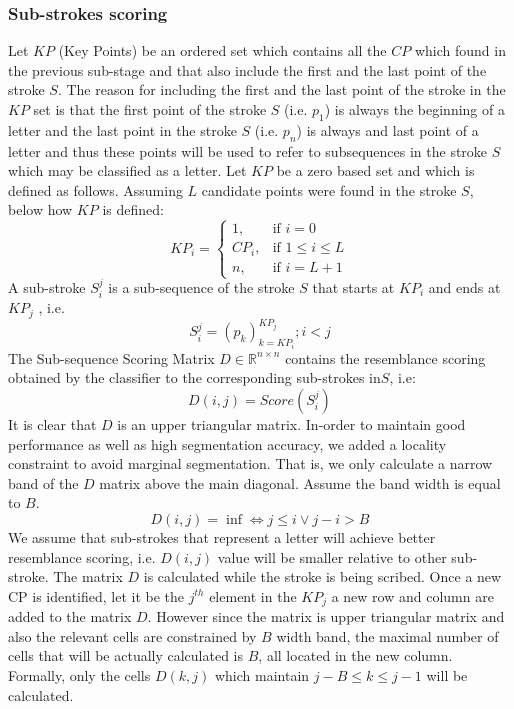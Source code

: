 \documentclass[journal,compsoc]{IEEEtran}
\begin{document}
\subsubsection{Sub-strokes scoring}
Let $KP$ (Key Points) be an ordered set which contains all the $CP$ which found in the previous sub-stage and that also include the first and the last point of the stroke $S$. The reason for including the first and the last point of the stroke in the $KP$ set is that the first point of the stroke $S$ (i.e. $p_{1}$) is always the beginning of a letter and the last point in the stroke $S$ (i.e. $p_{n}$) is always and last point of a letter and thus these points will be used to refer to subsequences in the stroke $S$ which may be classified as a letter. Let $KP$ be a zero based set and which is defined as follows. Assuming $L$ candidate points were found in the stroke $S$, below how $KP$ is defined: 
\begin{equation}
KP_{i} =\begin{cases}    1		, & \mbox{if } i=0 \\
							   CP_{i}	, & \mbox{if } 1\leq i \leq L \\
							   n    , & \mbox{if } i=L+1 
			\end{cases}				
\end{equation}
A sub-stroke $S_{i}^{j}$ is a sub-sequence of the stroke $S$ that starts at $KP_{i}$ and ends at $KP_{j}$ , i.e.
\begin{equation}
S_{i}^{j}=(p_{k})_{k=KP_{i}}^{KP_{j}}; i<j
\end{equation}
The Sub-sequence Scoring Matrix $D\in\mathbb{R}^{n\times n}$ contains the resemblance scoring obtained by the classifier to the corresponding sub-strokes in$S$, i.e:
\begin{equation}
D(i,j)=Score(S_{i}^{j})
\end{equation}
It is clear that $D$ is an upper triangular matrix. In-order to maintain good performance as well as high segmentation accuracy, we added a locality constraint to avoid marginal segmentation. That is, we only calculate a narrow band of the $D$ matrix above the main diagonal. Assume the band width is equal to $B$.
\begin{equation}
D(i,j)=\inf \Leftrightarrow j \leq i \vee j-i>B 
\end{equation}
We assume that sub-strokes that represent a letter will achieve better resemblance scoring, i.e. $D(i,j)$ value will be smaller relative to other sub-stroke. The matrix $D$ is calculated while the stroke is being scribed. Once a new CP is identified, let it be the $j^{th}$ element in the $KP_{j}$ a new row and column are added to the matrix $D$. However since the matrix is upper triangular matrix and also the relevant cells are constrained by $B$ width band, the maximal number of cells that will be actually calculated is $B$, all located in the new column. Formally, only the cells $D(k,j)$ which maintain $j-B\leq k \leq j-1$ will be calculated.\\
\end{document}
